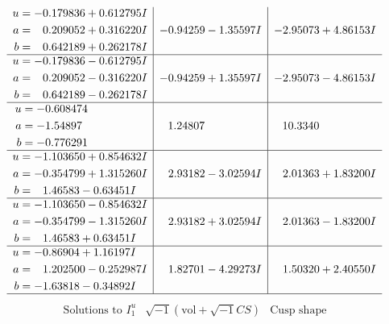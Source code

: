 \documentclass[1p]{elsarticle_modified}
\theoremstyle{definition}
\newcommand{\I}{\sqrt{-1}}
\begin{document}
$$\begin{array}{c|c|c}
\begin{aligned}
u &= -0.179836 + 0.612795 I \\
a &= \phantom{-}0.209052 + 0.316220 I \\
b &= \phantom{-}0.642189 + 0.262178 I\end{aligned}
 & -0.94259 - 1.35597 I & -2.95073 + 4.86153 I \\ \hline\begin{aligned}
u &= -0.179836 - 0.612795 I \\
a &= \phantom{-}0.209052 - 0.316220 I \\
b &= \phantom{-}0.642189 - 0.262178 I\end{aligned}
 & -0.94259 + 1.35597 I & -2.95073 - 4.86153 I \\ \hline\begin{aligned}
u &= -0.608474\phantom{ +0.000000I} \\
a &= -1.54897\phantom{ +0.000000I} \\
b &= -0.776291\phantom{ +0.000000I}\end{aligned}
 & \phantom{-}1.24807\phantom{ +0.000000I} & \phantom{-}10.3340\phantom{ +0.000000I} \\ \hline\begin{aligned}
u &= -1.103650 + 0.854632 I \\
a &= -0.354799 + 1.315260 I \\
b &= \phantom{-}1.46583 - 0.63451 I\end{aligned}
 & \phantom{-}2.93182 - 3.02594 I & \phantom{-}2.01363 + 1.83200 I \\ \hline\begin{aligned}
u &= -1.103650 - 0.854632 I \\
a &= -0.354799 - 1.315260 I \\
b &= \phantom{-}1.46583 + 0.63451 I\end{aligned}
 & \phantom{-}2.93182 + 3.02594 I & \phantom{-}2.01363 - 1.83200 I \\ \hline\begin{aligned}
u &= -0.86904 + 1.16197 I \\
a &= \phantom{-}1.202500 - 0.252987 I \\
b &= -1.63818 - 0.34892 I\end{aligned}
 & \phantom{-}1.82701 - 4.29273 I & \phantom{-}1.50320 + 2.40550 I\\
 \hline 
 \end{array}$$\newpage$$\begin{array}{c|c|c}  
\text{Solutions to }I^u_{1}& \I (\text{vol} + \sqrt{-1}CS) & \text{Cusp shape}\\

\end{array}$$
\end{document}
